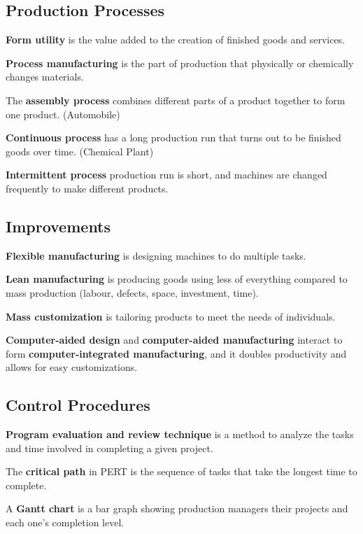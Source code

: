 \documentclass[english, 12pt]{article}
\begin{document}
\subsection{Production Processes}
\begin{defn}
\textbf{Form utility} is the value added to the creation of finished goods and services.
\end{defn}
\begin{defn}
\textbf{Process manufacturing} is the part of production that physically or chemically changes materials.
\end{defn}
\begin{defn}
The \textbf{assembly process} combines different parts of a product together to form one product. (Automobile)
\end{defn}
\begin{defn}
\textbf{Continuous process} has a long production run that turns out to be finished goods over time. (Chemical Plant)
\end{defn}
\begin{defn}
\textbf{Intermittent process} production run is short, and machines are changed frequently to make different products.
\end{defn}
\subsection{Improvements}
\begin{defn}
\textbf{Flexible manufacturing} is designing machines to do multiple tasks.
\end{defn}
\begin{defn}
\textbf{Lean manufacturing} is producing goods using less of everything compared to mass production (labour, defects, space, investment, time).
\end{defn}
\begin{defn}
\textbf{Mass customization} is tailoring products to meet the needs of individuals.
\end{defn}
\begin{defn}
\textbf{Computer-aided design} and \textbf{computer-aided manufacturing} interact to form \textbf{computer-integrated manufacturing}, and it doubles productivity and allows for easy customizations.
\end{defn}
\subsection{Control Procedures}
\begin{defn}[PERT]
\textbf{Program evaluation and review technique} is a method to analyze the tasks and time involved in completing a given project.
\end{defn}
\begin{defn}
The \textbf{critical path} in PERT is the sequence of tasks that take the longest time to complete.
\end{defn}
\begin{defn}
A \textbf{Gantt chart} is a bar graph showing production managers their projects and each one's completion level.
\end{defn}
\end{document}
